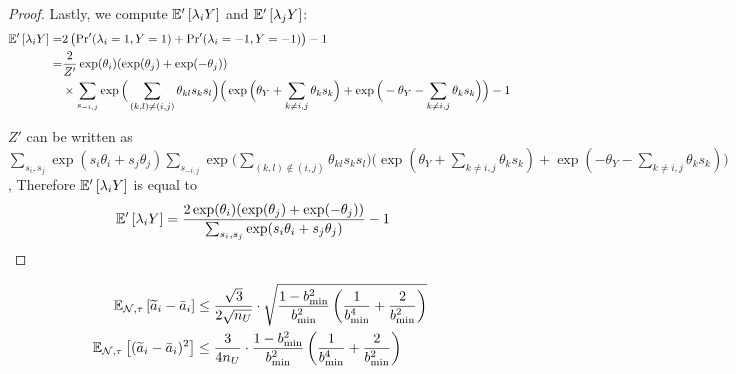 \begin{proof}
Lastly, we compute $\mathbb{E}'_{}\left[\lambda_i Y\right]$ and $\mathbb{E}'_{}\left[\lambda_j Y\right]$:
\begin{align}
    \mathbb{E}'_{}\left[\lambda_i Y\right] = &2 \left(\textrm{Pr}'(\lambda_i = 1, Y = 1) + \textrm{Pr}'(\lambda_i = -1, Y = -1) \right) - 1 \\
    = &\frac{2}{Z'} \exp(\theta_i) (\exp(\theta_j) + \exp(-\theta_j)) \\
    & \times \sum_{s_{-i, j}} \exp \Big( \sum_{(k, l) \neq (i, j)} \theta_{kl} s_k s_l\Big) \Big(\exp\Big(\theta_Y + \sum_{k \neq i, j} \theta_k s_k\Big) + \exp\Big(-\theta_Y - \sum_{k \neq i, j} \theta_k s_k\Big)\Big) - 1
\end{align}

$Z'$ can be written as $\sum_{s_i, s_j} \exp(s_i \theta_i + s_j \theta_j) \sum_{s_{-i, j}} \exp \Big(\sum_{(k, l) \notin (i, j)} \theta_{kl} s_k s_l \Big)\Big(\exp(\theta_Y + \sum_{k \neq i, j} \theta_k s_k) + \exp(-\theta_Y - \sum_{k \neq i, j} \theta_k s_k) \Big)$, Therefore $\mathbb{E}'_{}\left[\lambda_i Y\right]$ is equal to
\begin{align}
    \mathbb{E}'_{}\left[\lambda_i Y\right] &= \frac{2 \exp(\theta_i) (\exp(\theta_j) + \exp(-\theta_j))}{\sum_{s_i, s_j} \exp(s_i \theta_i + s_j \theta_j)} - 1
\end{align}

\end{proof}


\begin{lemma}

\begin{align*}
\mathbb{E}_{\mathcal{N}, \tau}\left[\widetilde{a}_i - \bar{a}_i\right] &\le \frac{\sqrt{3}}{2\sqrt{n_U}} \cdot \sqrt{\frac{1 - b_{\min}^2}{b_{\min}^2} \left(\frac{1}{b_{\min}^4} + \frac{2}{b_{\min}^2} \right)}\\
\mathbb{E}_{\mathcal{N}, \tau}\left[(\widetilde{a}_i - \bar{a}_i)^2\right] &\le \frac{3}{4 n_U} \cdot \frac{1 - b_{\min}^2}{b_{\min}^2} \left(\frac{1}{b_{\min}^4} + \frac{2}{b_{\min}^2} \right)
\end{align*}
\label{lemma:sampling_error}
\end{lemma}

